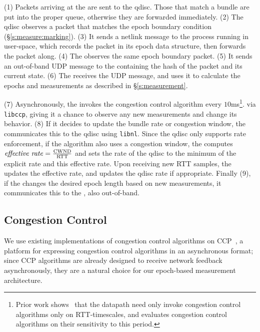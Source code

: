 (1) Packets arriving at the \inbox are sent to the qdisc. Those that match a bundle are put into the proper queue, 
otherwise they are forwarded immediately. (2) The qdisc observes a packet that matches the epoch boundary
condition (\S\ref{s:measure:marking}). (3) It sends a netlink message to the \inbox process running in user-space, which records the packet
in its epoch data structure, then forwards the packet along. (4) The \outbox observes the same epoch boundary
packet. (5) It sends an out-of-band UDP message to the \inbox containing the hash of the packet and its current state. 
(6) The \inbox receives the UDP message, and uses it to calculate the epochs and measurements as described 
in \S\ref{s:measurement}.

(7) Asynchronously, the \inbox invokes the congestion control algorithm every $10$ms\footnote{Prior work shows~\cite{ccp} that the datapath need only invoke congestion control algorithms only on RTT-timescales, and evaluates congestion control algorithms on their sensitivity to this period.}.
via \texttt{libccp},
giving it a chance to observe any new measurements and change its behavior. (8) If it decides to update
the bundle rate or congestion window, the \inbox communicates this to the qdisc
using \texttt{libnl}. Since the qdisc only supports rate enforcement, if the algorithm
also uses a congestion window, the \inbox computes $\text{\emph{effective rate}} = \frac{\text{CWND}}{\text{RTT}}$
and sets the rate of the qdisc to the minimum of the explicit rate and this effective rate.
Upon receiving new RTT samples, the \inbox updates the effective rate, and updates the qdisc rate if appropriate.
Finally (9), if the \inbox changes the desired epoch length based on new measurements, it communicates this to the \outbox, also out-of-band.







\subsection{Congestion Control}\label{s:impl:cc}
We use existing implementations of congestion control algorithms on CCP~\cite{ccp}, a platform for expressing congestion control algorithms in an asynchronous format; since CCP algorithms are already designed to receive network feedback asynchronously, they are a natural choice for our epoch-based measurement architecture. 

